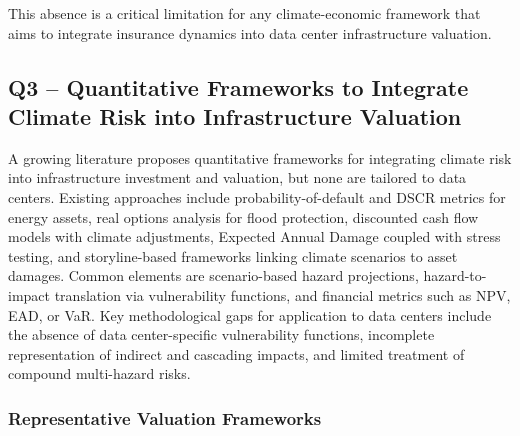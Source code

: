 This absence is a critical limitation for any climate-economic framework that
aims to integrate insurance dynamics into data center infrastructure
valuation.


\subsection{Q3 – Quantitative Frameworks to Integrate Climate Risk into Infrastructure Valuation}
\label{app:literature_q3}

A growing literature proposes quantitative frameworks for integrating climate
risk into infrastructure investment and valuation, but none are tailored to
data centers. Existing approaches include probability-of-default and DSCR
metrics for energy assets, real options analysis for flood protection,
discounted cash flow models with climate adjustments, Expected Annual Damage
coupled with stress testing, and storyline-based frameworks linking climate
scenarios to asset damages. Common elements are scenario-based hazard
projections, hazard-to-impact translation via vulnerability functions, and
financial metrics such as NPV, EAD, or VaR. Key methodological gaps for
application to data centers include the absence of data center-specific
vulnerability functions, incomplete representation of indirect and cascading
impacts, and limited treatment of compound multi-hazard risks.

\subsubsection{Representative Valuation Frameworks}

